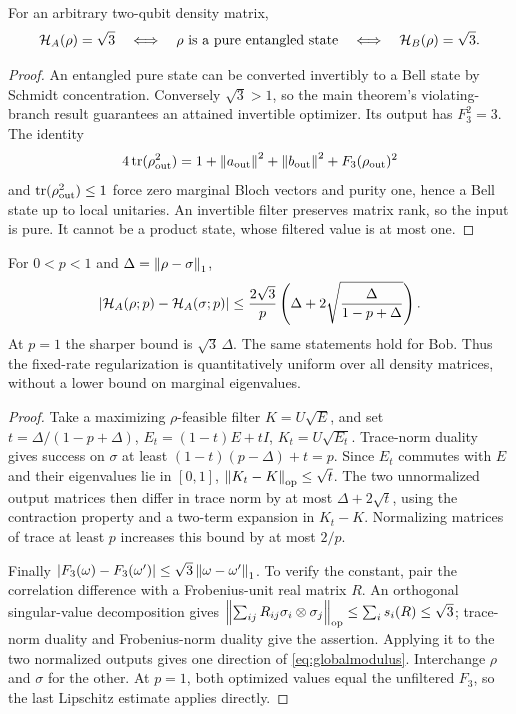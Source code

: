 \begin{corollary}\label{cor:bellrigidity}
For an arbitrary two-qubit density matrix,
\[
 \mathcal H_A(\rho)=\sqrt3
 \quad\Longleftrightarrow\quad
 \rho\text{ is a pure entangled state}
 \quad\Longleftrightarrow\quad
 \mathcal H_B(\rho)=\sqrt3.
\]
\end{corollary}
\begin{proof}
An entangled pure state can be converted invertibly to a Bell state by
Schmidt concentration. Conversely $\sqrt3>1$, so the main theorem's
violating-branch result guarantees an attained invertible optimizer.
Its output has $F_3^2=3$. The identity
\[
 4\operatorname{tr}(\rho_{\rm out}^2)=1+\left\lVert a_{\rm out}\right\rVert^2
             +\left\lVert b_{\rm out}\right\rVert^2+F_3(\rho_{\rm out})^2
\]
and $\operatorname{tr}(\rho_{\rm out}^2)\leq1$ force zero marginal Bloch vectors and
purity one, hence a Bell state up to local unitaries. An invertible
filter preserves matrix rank, so the input is pure. It cannot be a
product state, whose filtered value is at most one.
\end{proof}

\begin{proposition}
\label{prop:globalmodulus}
For $0<p<1$ and $\Delta=\left\lVert\rho-\sigma\right\rVert_1$,
\begin{equation}\label{eq:globalmodulus}
 |\mathcal H_A(\rho;p)-\mathcal H_A(\sigma;p)|
 \leq\frac{2\sqrt3}{p}
 \left(\Delta+2\sqrt{\frac{\Delta}{1-p+\Delta}}\right).
\end{equation}
At $p=1$ the sharper bound is $\sqrt3\,\Delta$. The same statements hold
for Bob. Thus the fixed-rate regularization is quantitatively uniform
over all density matrices, without a lower bound on marginal eigenvalues.
\end{proposition}
\begin{proof}
Take a maximizing $\rho$-feasible filter $K=U\sqrt E$, and set
$t=\Delta/(1-p+\Delta)$,
$E_t=(1-t)E+tI$, $K_t=U\sqrt{E_t}$.
Trace-norm duality gives success on $\sigma$ at least
$(1-t)(p-\Delta)+t=p$.
Since $E_t$ commutes with $E$ and their eigenvalues lie in $[0,1]$,
$\left\lVert K_t-K\right\rVert_{\rm op}\leq\sqrt t$.
The two unnormalized output matrices then differ in trace norm by at
most $\Delta+2\sqrt t$, using the contraction property and a two-term
expansion in $K_t-K$. Normalizing matrices of trace at least $p$ increases
this bound by at most $2/p$.

Finally $|F_3(\omega)-F_3(\omega')|\leq
\sqrt3\left\lVert\omega-\omega'\right\rVert_1$. To verify the constant, pair the
correlation difference with a Frobenius-unit real matrix $R$.
An orthogonal singular-value decomposition gives
$\left\lVert\sum_{ij}R_{ij}\sigma_i\otimes\sigma_j\right\rVert_{\rm op}
\leq\sum_i s_i(R)\leq\sqrt3$; trace-norm duality and Frobenius-norm
duality give the assertion. Applying it to the two normalized outputs
gives one direction of \eqref{eq:globalmodulus}. Interchange $\rho$ and
$\sigma$ for the other. At $p=1$, both optimized values equal the
unfiltered $F_3$, so the last Lipschitz estimate applies directly.
\end{proof}

